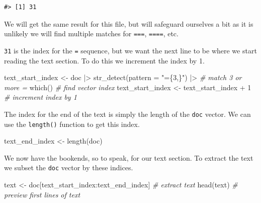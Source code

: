 \documentclass[
  letterpaper,
]{scrbook}
\newenvironment{Shaded}{\begin{snugshade}}{\end{snugshade}}
\newcommand{\AttributeTok}[1]{\textcolor[rgb]{0.00,0.00,0.00}{#1}}
\newcommand{\CommentTok}[1]{\textcolor[rgb]{0.00,0.00,0.00}{\textit{#1}}}
\newcommand{\DecValTok}[1]{\textcolor[rgb]{0.00,0.00,0.00}{#1}}
\newcommand{\FunctionTok}[1]{\textcolor[rgb]{0.00,0.00,0.00}{#1}}
\newcommand{\NormalTok}[1]{\textcolor[rgb]{0.00,0.00,0.00}{#1}}
\newcommand{\OtherTok}[1]{\textcolor[rgb]{0.00,0.00,0.00}{#1}}
\newcommand{\SpecialCharTok}[1]{\textcolor[rgb]{0.00,0.00,0.00}{#1}}
\newcommand{\StringTok}[1]{\textcolor[rgb]{0.00,0.00,0.00}{#1}}
\begin{document}
\begin{verbatim}
#> [1] 31
\end{verbatim}

We will get the same result for this file, but will safeguard ourselves
a bit as it is unlikely we will find multiple matches for \texttt{===},
\texttt{====}, etc.

\texttt{31} is the index for the \texttt{=} sequence, but we want the
next line to be where we start reading the text section. To do this we
increment the index by 1.

\begin{Shaded}
\begin{Highlighting}[]
\NormalTok{text\_start\_index }\OtherTok{\textless{}{-}} 
\NormalTok{  doc }\SpecialCharTok{|\textgreater{}} 
  \FunctionTok{str\_detect}\NormalTok{(}\AttributeTok{pattern =} \StringTok{"=\{3,\}"}\NormalTok{) }\SpecialCharTok{|\textgreater{}} \CommentTok{\# match 3 or more \textasciigrave{}=\textasciigrave{} }
  \FunctionTok{which}\NormalTok{() }\CommentTok{\# find vector index}
\NormalTok{text\_start\_index }\OtherTok{\textless{}{-}}\NormalTok{ text\_start\_index }\SpecialCharTok{+} \DecValTok{1} \CommentTok{\# increment index by 1}
\end{Highlighting}
\end{Shaded}

The index for the end of the text is simply the length of the
\texttt{doc} vector. We can use the \texttt{length()} function to get
this index.

\begin{Shaded}
\begin{Highlighting}[]
\NormalTok{text\_end\_index }\OtherTok{\textless{}{-}} \FunctionTok{length}\NormalTok{(doc)}
\end{Highlighting}
\end{Shaded}

We now have the bookends, so to speak, for our text section. To extract
the text we subset the \texttt{doc} vector by these indices.

\begin{Shaded}
\begin{Highlighting}[]
\NormalTok{text }\OtherTok{\textless{}{-}}\NormalTok{ doc[text\_start\_index}\SpecialCharTok{:}\NormalTok{text\_end\_index] }\CommentTok{\# extract text}
\FunctionTok{head}\NormalTok{(text) }\CommentTok{\# preview first lines of \textasciigrave{}text\textasciigrave{}}
\end{Highlighting}
\end{Shaded}
\end{document}
